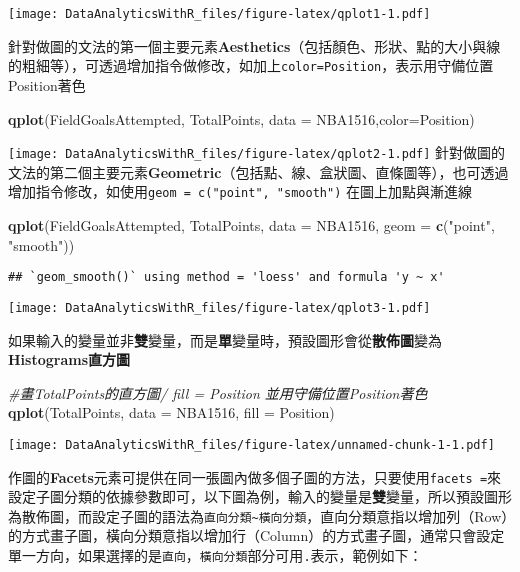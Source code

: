 \documentclass[
]{book}
\newenvironment{Shaded}{\begin{snugshade}}{\end{snugshade}}
\newcommand{\CommentTok}[1]{\textcolor[rgb]{0.56,0.35,0.01}{\textit{#1}}}
\newcommand{\DataTypeTok}[1]{\textcolor[rgb]{0.13,0.29,0.53}{#1}}
\newcommand{\KeywordTok}[1]{\textcolor[rgb]{0.13,0.29,0.53}{\textbf{#1}}}
\newcommand{\NormalTok}[1]{#1}
\newcommand{\StringTok}[1]{\textcolor[rgb]{0.31,0.60,0.02}{#1}}
\begin{document}
\texttt{[image: DataAnalyticsWithR\_files/figure-latex/qplot1-1.pdf]}

針對做圖的文法的第一個主要元素\textbf{Aesthetics}（包括顏色、形狀、點的大小與線的粗細等），可透過增加指令做修改，如加上\texttt{color=Position}，表示用守備位置Position著色

\begin{Shaded}
\begin{Highlighting}[]
\KeywordTok{qplot}\NormalTok{(FieldGoalsAttempted, TotalPoints, }\DataTypeTok{data =}\NormalTok{ NBA1516,}\DataTypeTok{color=}\NormalTok{Position)}
\end{Highlighting}
\end{Shaded}

\texttt{[image: DataAnalyticsWithR\_files/figure-latex/qplot2-1.pdf]}
針對做圖的文法的第二個主要元素\textbf{Geometric}（包括點、線、盒狀圖、直條圖等），也可透過增加指令修改，如使用\texttt{geom\ =\ c("point",\ "smooth")} 在圖上加點與漸進線

\begin{Shaded}
\begin{Highlighting}[]
\KeywordTok{qplot}\NormalTok{(FieldGoalsAttempted, TotalPoints, }\DataTypeTok{data =}\NormalTok{ NBA1516,}
      \DataTypeTok{geom =} \KeywordTok{c}\NormalTok{(}\StringTok{"point"}\NormalTok{, }\StringTok{"smooth"}\NormalTok{))}
\end{Highlighting}
\end{Shaded}

\begin{verbatim}
## `geom_smooth()` using method = 'loess' and formula 'y ~ x'
\end{verbatim}

\texttt{[image: DataAnalyticsWithR\_files/figure-latex/qplot3-1.pdf]}

如果輸入的變量並非\textbf{雙}變量，而是\textbf{單}變量時，預設圖形會從\textbf{散佈圖}變為\textbf{Histograms直方圖}

\begin{Shaded}
\begin{Highlighting}[]
\CommentTok{#畫TotalPoints的直方圖/ fill = Position 並用守備位置Position著色}
\KeywordTok{qplot}\NormalTok{(TotalPoints, }\DataTypeTok{data =}\NormalTok{ NBA1516, }\DataTypeTok{fill =}\NormalTok{ Position)}
\end{Highlighting}
\end{Shaded}

\texttt{[image: DataAnalyticsWithR\_files/figure-latex/unnamed-chunk-1-1.pdf]}

作圖的\textbf{Facets}元素可提供在同一張圖內做多個子圖的方法，只要使用\texttt{facets\ =}來設定子圖分類的依據參數即可，以下圖為例，輸入的變量是\textbf{雙}變量，所以預設圖形為散佈圖，而設定子圖的語法為\texttt{直向分類\textasciitilde{}橫向分類}，直向分類意指以增加列（Row）的方式畫子圖，橫向分類意指以增加行（Column）的方式畫子圖，通常只會設定單一方向，如果選擇的是\texttt{直向}，\texttt{橫向分類}部分可用\texttt{.}表示，範例如下：
\end{document}
